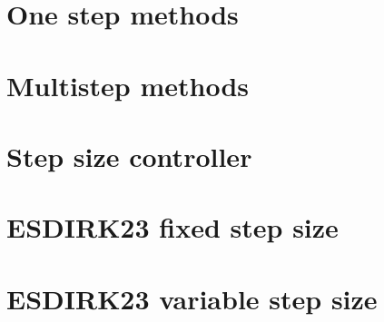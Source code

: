 \section{One step methods}




\section{Multistep methods}





\section{Step size controller}







\section{ESDIRK23 fixed step size}



\section{ESDIRK23 variable step size}

